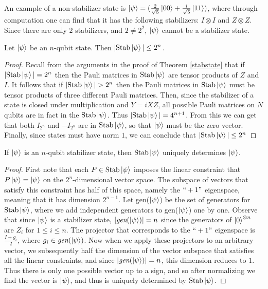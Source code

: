 \documentclass[12pt]{dalthesis}
\begin{document}
An example of a non-stabilizer state is $\ket{\psi} = (\frac{2}{\sqrt{5}}\ket{00} + \frac{i}{\sqrt{5}} \ket{11})$, where through computation one can find that it has the following stabilizers: $I \otimes I$ and $Z \otimes Z$. Since there are only $2$ stabilizers, and $2 \neq 2^2$, $\ket{\psi}$ cannot be a stabilizer state.

\begin{lemma}
\label{StabSize}
Let $\ket{\psi}$ be an $n$-qubit state. Then $|\mathrm{Stab} \ket{\psi}| \leq 2^n$.  
\end{lemma}
\begin{proof}
Recall from the arguments in the proof of Theorem \ref{stabstate} that if $|\mathrm{Stab} \ket{\psi}| = 2^n$ then the Pauli matrices in $\mathrm{Stab} \ket{\psi}$ are tensor products of $Z$ and $I$. It follows that if $|\mathrm{Stab} \ket{\psi}| > 2^n$ then the Pauli matrices in $\mathrm{Stab} \ket{\psi}$ must be tensor products of three different Pauli matrices. Then, since the stabilizer of a state is closed under multiplication and $Y = iXZ$, all possible Pauli matrices on $N$ qubits are in fact in the $\mathrm{Stab} \ket{\psi}$. Thus $|\mathrm{Stab} \ket{\psi}| = 4^{n+1}$. From this we can get that both $I_{2^n}$ and $-I_{2^n}$ are in $\mathrm{Stab} \ket{\psi}$, so that $\ket{\psi}$ must be the zero vector. Finally, since states must have norm $1$, we can conclude that $|\mathrm{Stab} \ket{\psi}| \leq 2^n$ 
\end{proof}

\begin{theorem}
\label{Unique}
If $\ket{\psi}$ is an $n$-qubit stabilizer state, then $\mathrm{Stab}\ket{\psi}$ uniquely determines $\ket{\psi}$.
\end{theorem}
\begin{proof}
First note that each $P \in \mathrm{Stab}\ket{\psi}$ imposes the linear constraint that $P\ket{\psi} = \ket{\psi}$ on the $2^n$-dimensional vector space. The subspace of vectors that satisfy this constraint has half of this space, namely the $``+1"$ eigenspace, meaning that it has dimension $2^{n-1}$. Let gen($\ket{\psi}$) be the set of generators for $\mathrm{Stab}\ket{\psi}$, where we add independent generators to gen($\ket{\psi}$) one by one. Observe that since $\ket{\psi}$ is a stabilizer state, $|\textit{gen}(\ket{\psi})| = n$ since the generators of $\ket{0}^{\otimes n}$ are $Z_i$ for $1 \leq i \leq n$. The projector that corresponds to the $``+1"$ eigenspace is $\frac{I+g_i}{2}$, where $g_i \in \textit{gen}(\ket{\psi})$. Now when we apply these projectors to an arbitrary vector, we subsequently half the dimension of the vector subspace that satisfies all the linear constraints, and since $|\textit{gen}(\ket{\psi})| = n$, this dimension reduces to $1$. Thus there is only one possible vector up to a sign, and so after normalizing we find the vector is $\ket{\psi}$, and thus is uniquely determined by $\mathrm{Stab} \ket{\psi}$.
\end{proof}
\end{document}
